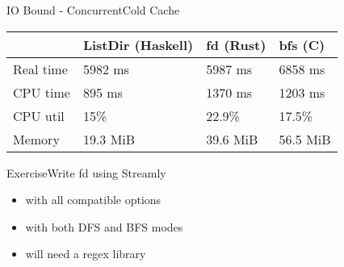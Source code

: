 \documentclass[17pt]{beamer}
\begin{document}
\begin{frame}{IO Bound - Concurrent}{Cold Cache}
\footnotesize

\begin{tabular}{|l|l|l|l|}
\hline
  & ListDir (Haskell)
  & fd (Rust)
  & bfs (C)
  \\
\hline
  Real time
  & 5982 ms
  & 5987 ms
  & 6858 ms
  \\
\hline
  CPU time
  & 895 ms
  & 1370 ms
  & 1203 ms
  \\
\hline
  CPU util
  & 15\%
  & 22.9\%
  & 17.5\%
  \\
\hline
  Memory
  & 19.3 MiB
  & 39.6 MiB
  & 56.5 MiB
  \\
\hline
\end{tabular}

\end{frame}

\begin{frame}{Exercise}{Write fd using Streamly}
\begin{itemize}
  \item with all compatible options
  \item with both DFS and BFS modes
  \item will need a regex library
\end{itemize}
\end{frame}
\end{document}
